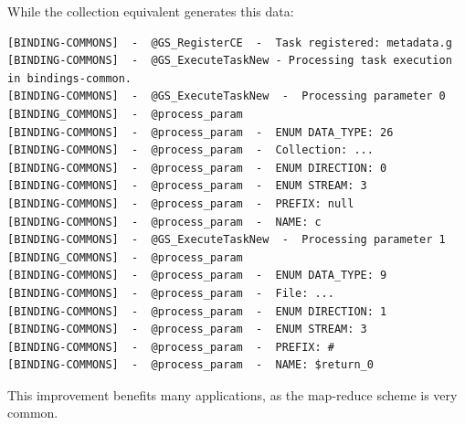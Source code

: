 While the collection equivalent generates this data:

\begin{verbatim}
[BINDING-COMMONS]  -  @GS_RegisterCE  -  Task registered: metadata.g
[BINDING-COMMONS]  -  @GS_ExecuteTaskNew - Processing task execution in bindings-common. 
[BINDING-COMMONS]  -  @GS_ExecuteTaskNew  -  Processing parameter 0
[BINDING_COMMONS]  -  @process_param
[BINDING-COMMONS]  -  @process_param  -  ENUM DATA_TYPE: 26
[BINDING-COMMONS]  -  @process_param  -  Collection: ...
[BINDING-COMMONS]  -  @process_param  -  ENUM DIRECTION: 0
[BINDING-COMMONS]  -  @process_param  -  ENUM STREAM: 3
[BINDING-COMMONS]  -  @process_param  -  PREFIX: null
[BINDING-COMMONS]  -  @process_param  -  NAME: c
[BINDING-COMMONS]  -  @GS_ExecuteTaskNew  -  Processing parameter 1
[BINDING_COMMONS]  -  @process_param
[BINDING-COMMONS]  -  @process_param  -  ENUM DATA_TYPE: 9
[BINDING-COMMONS]  -  @process_param  -  File: ...
[BINDING-COMMONS]  -  @process_param  -  ENUM DIRECTION: 1
[BINDING-COMMONS]  -  @process_param  -  ENUM STREAM: 3
[BINDING-COMMONS]  -  @process_param  -  PREFIX: #
[BINDING-COMMONS]  -  @process_param  -  NAME: $return_0
\end{verbatim}

This improvement benefits many applications, as the map-reduce scheme is very common.